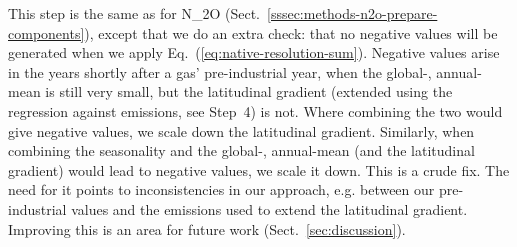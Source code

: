 This step is the same as for N_2O (Sect.~\ref{sssec:methods-n2o-prepare-components}),
except that we do an extra check: that no negative values will be generated when we apply Eq.~(\ref{eq:native-resolution-sum}).
Negative values arise in the years shortly after a gas' pre-industrial year,
when the global-, annual-mean is still very small,
but the latitudinal gradient (extended using the regression against emissions, see Step~4) is not.
Where combining the two would give negative values,
we scale down the latitudinal gradient.
Similarly, when combining the seasonality and the global-, annual-mean
(and the latitudinal gradient) would lead to negative values, we scale it down.
This is a crude fix.
The need for it points to inconsistencies in our approach,
e.g. between our pre-industrial values and the emissions used to extend the latitudinal gradient.
Improving this is an area for future work (Sect.~\ref{sec:discussion}).


